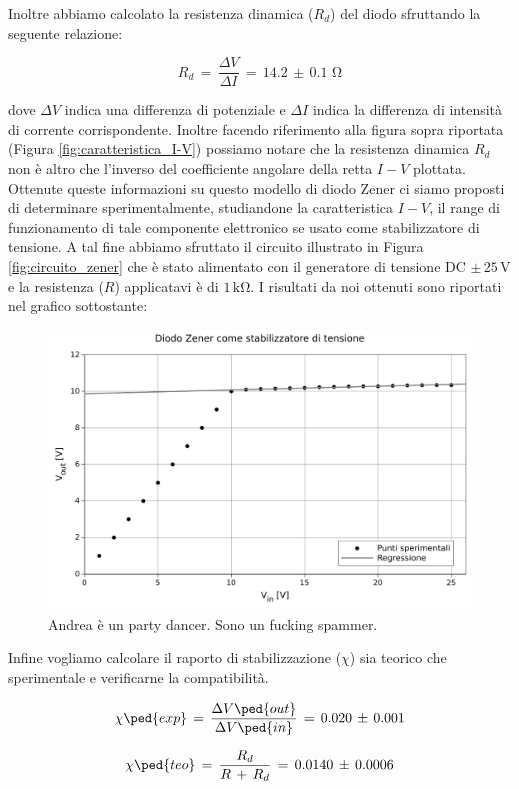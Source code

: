Inoltre abbiamo calcolato la resistenza dinamica ($R_d$) del diodo sfruttando la seguente relazione:

\begin{equation}
	R_d \,=\, \frac{\Delta V}{\Delta I} \,=\, 14.2\,\pm\,0.1 \,\,\si{\ohm}
\end{equation}


dove $\Delta V$ indica una differenza di potenziale e $\Delta I$ indica la differenza di intensità di corrente corrispondente. Inoltre facendo riferimento alla figura sopra riportata (Figura \ref{fig:caratteristica_I-V}) possiamo notare che la resistenza dinamica $R_d$ non è altro che l'inverso del coefficiente angolare della retta $I-V$ plottata.\\

Ottenute queste informazioni su questo modello di diodo Zener ci siamo proposti di determinare sperimentalmente, studiandone la caratteristica $I-V$, il range di funzionamento di tale componente elettronico se usato come stabilizzatore di tensione.
A tal fine abbiamo sfruttato il circuito illustrato in Figura \ref{fig:circuito_zener} che è stato alimentato con il generatore di tensione DC $\pm\,25\,\si{\volt}$ e la resistenza ($R$) applicatavi è di $1\,\si{\kilo\ohm}$.
I risultati da noi ottenuti sono riportati nel grafico sottostante:

\begin{figure}[H]
    \includegraphics[scale=0.7]{stab.pdf}
    \caption{Andrea è un party dancer. Sono un fucking spammer.}
    \label{fig:stab_tensione}
\end{figure}

Infine vogliamo calcolare il raporto di stabilizzazione ($\chi$) sia teorico che sperimentale e verificarne la compatibilità.

\begin{equation}
	\chi\ped{exp} \,=\, \frac{\Delta V\ped{out}}{\Delta V\ped{in}} \,=\, 0.020\,\pm\,0.001
	\label{eq:c_exp}
\end{equation}

\begin{equation}
	\chi\ped{teo} \,=\, \frac{R_d}{R\,+\,R_d} \,=\, 0.0140\,\pm\,0.0006
	\label{eq:c_teo}
\end{equation}
